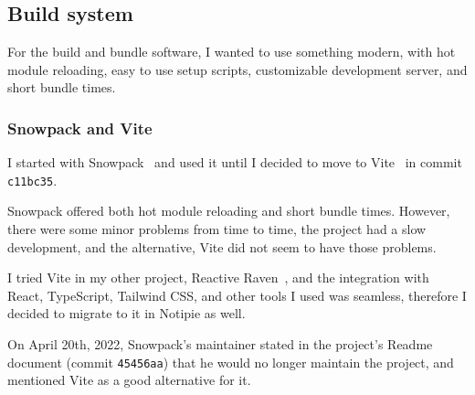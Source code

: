 \subsection{Build system}\label{build-system}

For the build and bundle software,
I wanted to use something modern,
with hot module reloading,
easy to use setup scripts,
customizable development server,
and short bundle times.

\subsubsection{Snowpack and Vite}\label{snowpack-and-vite}

I started with Snowpack~\cite{schott_snowpack_2021}
and used it until I decided to move to Vite~\cite{you_vite_2022}
in commit \texttt{c11bc35}.

Snowpack offered both hot module reloading and short bundle times.
However, there were some minor problems from time to time,
the project had a slow development,
and the alternative,
Vite did not seem to have those problems.

I tried Vite in my other project,
Reactive Raven~\cite{sewera_reactive_2022},
and the integration with
React,
TypeScript,
Tailwind CSS,
and other tools I used was seamless,
therefore I decided to migrate to it in Notipie as well.

On April 20th, 2022,
Snowpack's maintainer stated in the project's Readme document
(commit \texttt{45456aa})
that he would no longer maintain the project,
and mentioned Vite as a good alternative for it.

